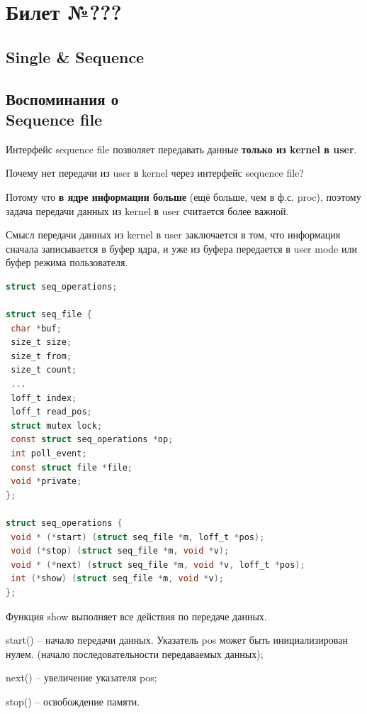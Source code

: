 \chapter{Билет №???}

\section*{Single \& Sequence}

\section{Воспоминания о \\ Sequence file}

Интерфейс sequence file позволяет передавать данные \textbf{только из kernel в user}.

Почему нет передачи из user в kernel через интерфейс sequence file?

Потому что \textbf{в ядре информации больше} (ещё больше, чем в ф.с. proc), поэтому задача передачи данных из kernel в user считается более важной.

Смысл передачи данных из kernel в user заключается в том, что информация сначала записывается в буфер ядра, и уже из буфера передается в user mode или буфер режима пользователя.
\begin{lstlisting}[language=C, label=lst:1, caption= Структуры]
struct seq_operations;

struct seq_file {
 char *buf;
 size_t size;
 size_t from;
 size_t count;
 ...
 loff_t index;
 loff_t read_pos;
 struct mutex lock;
 const struct seq_operations *op;
 int poll_event;
 const struct file *file;
 void *private;
};

struct seq_operations {
 void * (*start) (struct seq_file *m, loff_t *pos);
 void (*stop) (struct seq_file *m, void *v);
 void * (*next) (struct seq_file *m, void *v, loff_t *pos);
 int (*show) (struct seq_file *m, void *v);
};
\end{lstlisting}

Функция show выполняет все действия по передаче данных. 

start() -- начало передачи данных. Указатель pos может быть инициализирован нулем. (начало последовательности передаваемых данных);

next() -- увеличение указателя pos;

stop() -- освобождение памяти.

